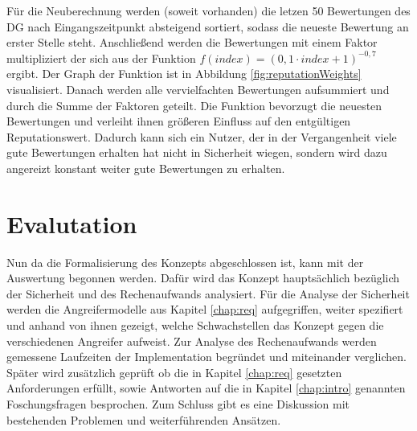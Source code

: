 \documentclass[
	fontsize=11pt,
	headings=small,
	parskip=half,           %
	bibliography=totoc,
	numbers=noenddot,       %
	open=any,               %
]{scrreprt}
\begin{document}
Für die Neuberechnung werden (soweit vorhanden) die letzen 50 Bewertungen des DG nach Eingangszeitpunkt absteigend sortiert, sodass die neueste Bewertung an erster Stelle steht. Anschließend werden die Bewertungen mit einem Faktor multipliziert der sich aus der Funktion $f(index)=(0,1\cdot index + 1)^{-0,7}$ ergibt. Der Graph der Funktion ist in Abbildung \ref{fig:reputationWeights} visualisiert. Danach werden alle vervielfachten Bewertungen aufsummiert und durch die Summe der Faktoren geteilt. Die Funktion bevorzugt die neuesten Bewertungen und verleiht ihnen größeren Einfluss auf den entgültigen Reputationswert. Dadurch kann sich ein Nutzer, der in der Vergangenheit viele gute Bewertungen erhalten hat nicht in Sicherheit wiegen, sondern wird dazu angereizt konstant weiter gute Bewertungen zu erhalten.






\chapter{Evalutation}
\label{chap:auswertung}
Nun da die Formalisierung des Konzepts abgeschlossen ist, kann mit der Auswertung begonnen werden. Dafür wird das Konzept hauptsächlich bezüglich der Sicherheit und des Rechenaufwands analysiert. Für die Analyse der Sicherheit werden die Angreifermodelle aus Kapitel \ref{chap:req} aufgegriffen, weiter spezifiert und anhand von ihnen gezeigt, welche Schwachstellen das Konzept gegen die verschiedenen Angreifer aufweist. Zur Analyse des Rechenaufwands werden gemessene Laufzeiten der Implementation begründet und miteinander verglichen. Später wird zusätzlich geprüft ob die in Kapitel \ref{chap:req} gesetzten Anforderungen erfüllt, sowie Antworten auf die in Kapitel \ref{chap:intro} genannten Foschungsfragen besprochen. Zum Schluss gibt es eine Diskussion mit bestehenden Problemen und weiterführenden Ansätzen.
\end{document}
